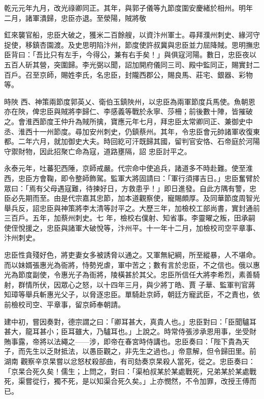 \begin{pinyinscope}
 乾元元年九月，改光祿卿同正。其年，與郭子儀等九節度圍安慶緒於相州。明年
 二月，諸軍潰歸，忠臣亦退。至滎陽，賊將敬



 釭來襲官船，忠臣大破之，獲米二百餘艘，以資汴州軍士。尋拜濮州刺史、緣河守捉使，移鎮杏園渡。及史思明陷汴州，節度使許叔冀與忠臣並力屈降賊。思明撫忠臣背曰：「吾比只有左手，今得公，兼有右手矣！」與俱寇河陽。數日，忠臣夜以五百人斫其營，突圍歸。李光弼以聞，詔加開府儀同三司、殿中監同正，賜實封二百戶。召至京師，賜姓李氏，名忠臣，封隴西郡公，賜良馬、莊宅、銀器、彩物等。



 時陜
 西、神策兩節度郭英乂、衛伯玉鎮陜州，以忠臣為兩軍節度兵馬使。魚朝恩亦在陜，俾忠臣與賊將李歸仁、李感義等戰於永寧、莎柵；前後數十陣，皆摧破之。會淮西節度王仲升為賊所擒，寶應元年七月，拜忠臣太常卿同正、兼御史中丞、淮西十一州節度。尋加安州刺史，仍鎮蔡州。其年，令忠臣會元帥諸軍收復東都。二年六月，就加御史大夫。時回紇可汗既歸其國，留判官安恪、石帝庭於河陽守禦財物，因此招聚亡命為寇，道路壅隔，詔
 忠臣討平之。



 永泰元年，吐蕃犯西陲，京師戒嚴。代宗命中使追兵，諸道多不時赴難。使至淮西，忠臣方會鞠，即令整師飾駕。監軍大將固請曰：「軍行須擇吉日。」忠臣奮臂於眾曰：「焉有父母遇寇難，待揀好日，方救患乎！」即日進發。自此方隅有警，忠臣必先期而至。由是代宗嘉其忠節，加本道觀察使，寵賜頗厚。及同華節度周智光舉兵反，詔忠臣與神策將李太清等討平之。大歷三年，加檢校工部尚書，實封通前三百戶。五年，加蔡州刺史。七
 年，檢校右僕射、知省事。李靈曜之叛，田承嗣使侄悅援之，忠臣與諸軍大破悅等，汴州平。十一年十二月，加檢校司空平章事、汴州刺史。



 忠臣性貪殘好色，將吏妻女多被誘脅以通之。又軍無紀綱，所至縱暴，人不堪命。而以妹婿張惠光為衙將，恃勢兇虐，軍中苦之；數有言於忠臣，不之信也。俄以惠光為節度副使，令惠光子為衙將，陵橫甚於其父。忠臣所信任大將李希烈，素善騎射，群情所伏，因眾心之怒，以十四年三月，與少將丁皓、賈
 子華、監軍判官蔣知璋等舉兵斬惠光父子，以脅逐忠臣。單騎赴京師，朝廷方寵武臣，不之責也，依前檢校司空、平章事，留京師奉朝請。



 建中初，嘗因奏對，德宗謂之曰：「卿耳甚大，真貴人也。」忠臣對曰：「臣聞驢耳甚大，龍耳甚小；臣耳雖大，乃驢耳也。」上說之。時常侍張涉承恩用事，坐受財賄事露，帝將以法繩之——涉，即帝在春宮時侍講也。忠臣奏曰：「陛下貴為天子，而先生以乏財抵法，以愚臣觀之，非先生之過也。」帝意解，但令歸田里。前湖南
 觀察辛京杲嘗以忿怒杖殺部曲，有司劾奏京杲殺人當死，從之。忠臣奏曰：「京杲合死久矣！儒生；上問之，對曰：「渠柏叔某於某處戰死，兄弟某於某處戰死，渠嘗從行，獨不死，是以知渠合死久矣。」上亦憫然，不令加罪，改授王傅而已。




\end{pinyinscope}
